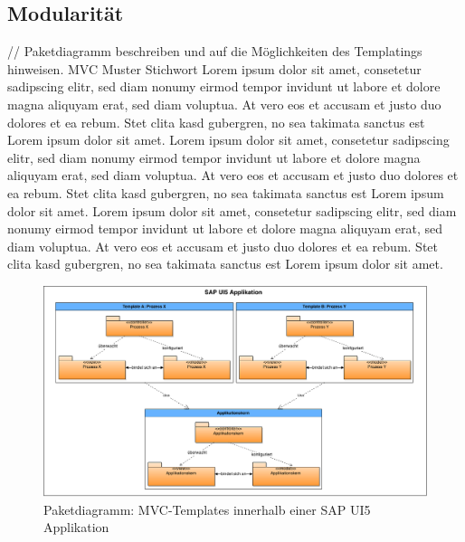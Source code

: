\newpage
\subsection{Modularität}
// Paketdiagramm beschreiben und auf die Möglichkeiten des Templatings hinweisen. MVC Muster Stichwort
Lorem ipsum dolor sit amet, consetetur sadipscing elitr, sed diam nonumy eirmod tempor invidunt ut labore et dolore magna aliquyam erat, sed diam voluptua. At vero eos et accusam et justo duo dolores et ea rebum. Stet clita kasd gubergren, no sea takimata sanctus est Lorem ipsum dolor sit amet. Lorem ipsum dolor sit amet, consetetur sadipscing elitr, sed diam nonumy eirmod tempor invidunt ut labore et dolore magna aliquyam erat, sed diam voluptua. At vero eos et accusam et justo duo dolores et ea rebum. Stet clita kasd gubergren, no sea takimata sanctus est Lorem ipsum dolor sit amet. Lorem ipsum dolor sit amet, consetetur sadipscing elitr, sed diam nonumy eirmod tempor invidunt ut labore et dolore magna aliquyam erat, sed diam voluptua. At vero eos et accusam et justo duo dolores et ea rebum. Stet clita kasd gubergren, no sea takimata sanctus est Lorem ipsum dolor sit amet. 

\vspace{1em}
\begin{figure}[htb]
  \centering
  \includegraphics[width=1\linewidth]{abb/paketdiagramm}
  \caption[Paketdiagramm: MVC-Templates innerhalb einer SAP UI5 Applikation]{Paketdiagramm: MVC-Templates innerhalb einer SAP UI5 Applikation}
  \label{fig:paketdiagramm}
\end{figure}

\newpage
